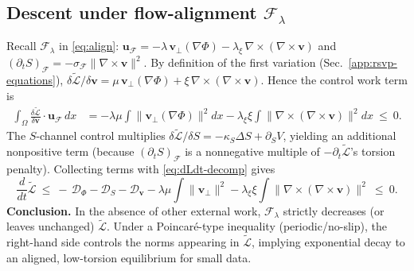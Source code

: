 \documentclass[a4paper,11pt]{article}
\begin{document}
\subsection{Descent under flow-alignment \texorpdfstring{$\mathcal F_\lambda$}{F}}
Recall $\mathcal F_\lambda$ in \eqref{eq:align}:
$\mathbf u_{\mathcal F}=-\lambda\,\mathbf v_\perp(\nabla\Phi)-\lambda_\xi\,\nabla\times(\nabla\times\mathbf v)$
and $(\partial_t S)_{\mathcal F}=-\sigma_{\mathcal F}\|\nabla\times\mathbf v\|^2$.
By definition of the first variation (Sec.~\ref{app:rsvp-equations}),
$\delta\widetilde{\mathcal{L}}/\delta \mathbf v
=\mu\,\mathbf v_\perp(\nabla\Phi)+\xi\,\nabla\times(\nabla\times \mathbf v)$.
Hence the control work term is
\begin{align}
\int_\Omega \frac{\delta\widetilde{\mathcal{L}}}{\delta \mathbf v}\cdot \mathbf u_{\mathcal F}\,dx
&=
-\lambda \mu \int \|\mathbf v_\perp(\nabla\Phi)\|^2 dx
-\lambda_\xi \xi \int \|\nabla\times(\nabla\times\mathbf v)\|^2 dx
\ \le\ 0.
\label{eq:align-v}
\end{align}
The $S$-channel control multiplies $\delta\widetilde{\mathcal{L}}/\delta S
=-\kappa_S \Delta S + \partial_S V$, yielding an additional nonpositive term
(because $(\partial_t S)_{\mathcal F}$ is a nonnegative multiple of
$-\partial_t \widetilde{\mathcal{L}}$’s torsion penalty). Collecting terms with
\eqref{eq:dLdt-decomp} gives
\begin{equation}
\frac{d}{dt}\widetilde{\mathcal{L}}
\ \le\
-\,\mathcal{D}_\Phi - \mathcal{D}_S - \mathcal{D}_{\mathbf v}
-\lambda \mu \int \|\mathbf v_\perp\|^2
-\lambda_\xi \xi \int \|\nabla\times(\nabla\times\mathbf v)\|^2
\ \le\ 0.
\label{eq:align-descent}
\end{equation}
\textbf{Conclusion.} In the absence of other external work, $\mathcal F_\lambda$
strictly decreases (or leaves unchanged) $\widetilde{\mathcal{L}}$. Under a
Poincaré-type inequality (periodic/no-slip), the right-hand side controls the
norms appearing in $\widetilde{\mathcal{L}}$, implying exponential decay to an
aligned, low-torsion equilibrium for small data.
\end{document}
